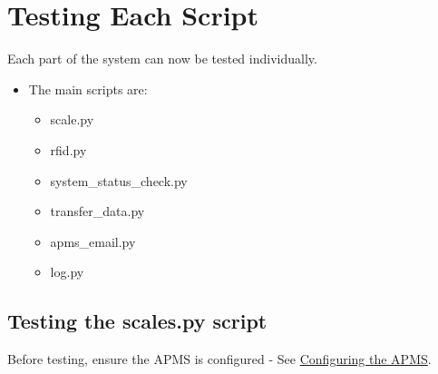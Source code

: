 \documentclass[
  letterpaper,
]{scrbook}
\begin{document}
\chapter{Testing Each Script}\label{testing-each-script}

Each part of the system can now be tested individually.

\begin{itemize}
\item
  The main scripts are:

  \begin{itemize}
  \item
    scale.py
  \item
    rfid.py
  \item
    system\_status\_check.py
  \item
    transfer\_data.py
  \item
    apms\_email.py
  \item
    log.py
  \end{itemize}
\end{itemize}

\section{Testing the scales.py
script}\label{testing-the-scales.py-script}

Before testing, ensure the APMS is configured - See
\hyperref[Configuringux5cux2520theux5cux2520APMS]{Configuring the APMS}.
\end{document}
